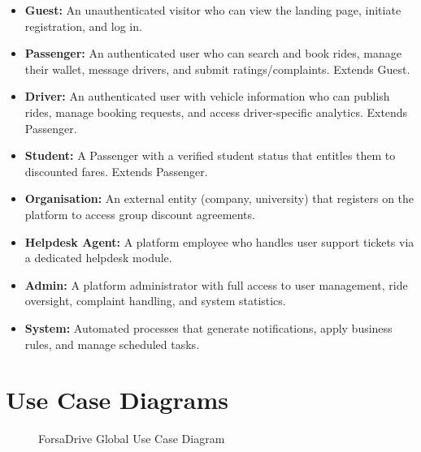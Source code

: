\documentclass[12pt,a4paper,openright]{report}
\begin{document}
\begin{itemize}[noitemsep]
    \item \textbf{Guest:} An unauthenticated visitor who can view the landing page, initiate registration, and log in.
    \item \textbf{Passenger:} An authenticated user who can search and book rides, manage their wallet, message drivers, and submit ratings/complaints. Extends Guest.
    \item \textbf{Driver:} An authenticated user with vehicle information who can publish rides, manage booking requests, and access driver-specific analytics. Extends Passenger.
    \item \textbf{Student:} A Passenger with a verified student status that entitles them to discounted fares. Extends Passenger.
    \item \textbf{Organisation:} An external entity (company, university) that registers on the platform to access group discount agreements.
    \item \textbf{Helpdesk Agent:} A platform employee who handles user support tickets via a dedicated helpdesk module.
    \item \textbf{Admin:} A platform administrator with full access to user management, ride oversight, complaint handling, and system statistics.
    \item \textbf{System:} Automated processes that generate notifications, apply business rules, and manage scheduled tasks.
\end{itemize}

\section{Use Case Diagrams}

\begin{figure}[H]
\centering
\caption{ForsaDrive Global Use Case Diagram}
\label{fig:usecase-global}
\end{figure}
\end{document}
